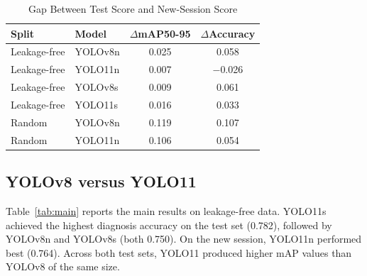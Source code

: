 \documentclass[conference]{IEEEtran}
\begin{document}
\begin{table}[htbp]
\caption{Gap Between Test Score and New-Session Score}
\begin{center}
\setlength{\tabcolsep}{3pt}
\begin{tabular}{|l|l|c|c|}
\hline
\textbf{Split} & \textbf{Model} & \textbf{$\Delta$mAP50-95} & \textbf{$\Delta$Accuracy} \\
\hline
Leakage-free & YOLOv8n & 0.025 & 0.058 \\
Leakage-free & YOLO11n & 0.007 & $-$0.026 \\
Leakage-free & YOLOv8s & 0.009 & 0.061 \\
Leakage-free & YOLO11s & 0.016 & 0.033 \\
\hline
Random & YOLOv8n & 0.119 & 0.107 \\
Random & YOLO11n & 0.106 & 0.054 \\
\hline
\end{tabular}
\par\vspace{2pt}{\scriptsize Leakage-free: mean of three seeds. Random split: one seed.}
\label{tab:leak}
\end{center}
\end{table}

\subsection{YOLOv8 versus YOLO11}
Table~\ref{tab:main} reports the main results on leakage-free data. YOLO11s achieved the highest diagnosis accuracy on the test set (0.782), followed by YOLOv8n and YOLOv8s (both 0.750). On the new session, YOLO11n performed best (0.764). Across both test sets, YOLO11 produced higher mAP values than YOLOv8 of the same size.
\end{document}

